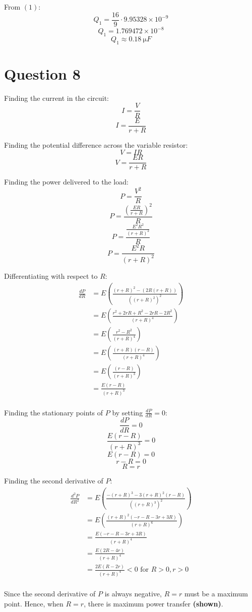 \documentclass[11pt]{article}
\begin{document}
From \((1)\):
\[Q_1 = \frac{16}{9} \cdot 9.95328 \times 10^{-9}\]
\[Q_1 = 1.769472 \times 10^{-8}\]
\[Q_1 \approx \qty{0.18}{\unit{\micro F}}\]
\section{Question 8}
\label{sec:org4a22574}
Finding the current in the circuit:
\[I = \frac{V}{R}\]
\[I = \frac{E}{r + R}\]

Finding the potential difference across the variable resistor:
\[V = IR\]
\[V = \frac{ER}{r + R}\]

Finding the power delivered to the load:
\[P = \frac{V^2}{R}\]
\[P = \frac{\left( \frac{ER}{r + R}\right)^2}{R}\]
\[P = \frac{\frac{E^2 R^2}{(r + R)^2}}{R}\]
\[P = \frac{E^2 R}{(r + R)^2}\]

Differentiating with respect to \(R\):
\begin{align*}
\frac{dP}{dR} &= E \left( \frac{(r + R)^2 - (2R(r + R))}{((r + R)^2)^2} \right) \\
&= E \left( \frac{r^2 + 2rR + R^2 - 2rR - 2R^2}{(r + R)^4} \right) \\
&= E \left( \frac{r^2 - R^2}{(r + R)^4} \right) \\
&= E \left( \frac{(r + R)(r - R)}{(r + R)^4} \right) \\
&= E \left( \frac{(r - R)}{(r + R)^3} \right) \\
&= \frac{E(r - R)}{(r + R)^3} \\
\end{align*}

Finding the stationary points of \(P\) by setting \(\frac{dP}{dR} = 0\):
\[\frac{dP}{dR} = 0\]
\[\frac{E(r - R)}{(r + R)^3} = 0\]
\[E(r - R) = 0\]
\[r - R = 0\]
\[R = r\]

Finding the second derivative of \(P\):
\begin{align*}
\frac{d^2P}{dR^2} &= E \left( \frac{-(r + R)^3 - 3(r + R)^2 (r - R)}{((r + R)^3)^2} \right) \\
&= E \left( \frac{(r + R)^2 (- r - R - 3r + 3R)}{(r + R)^6} \right) \\
&= \frac{E(- r - R - 3r + 3R)}{(r + R)^4} \\
&= \frac{E(2R - 4r)}{(r + R)^4} \\
&= \frac{2E(R - 2r)}{(r + R)^4} < 0 \text{ for } R > 0, r > 0\\
\end{align*}

Since the second derivative of \(P\) is always negative, \(R = r\) must be a maximum point. Hence, when \(R = r\), there is maximum power transfer \textbf{(shown)}.
\end{document}

